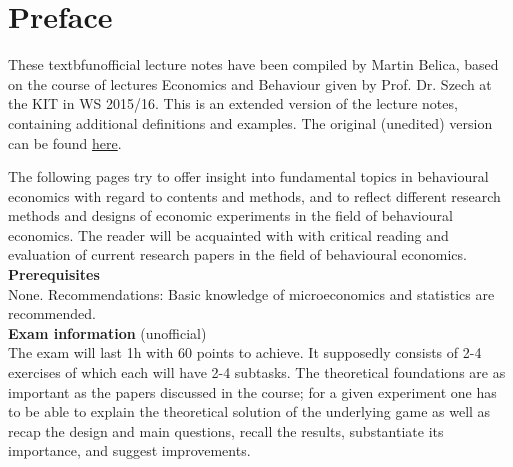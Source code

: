 

\chapter*{Preface}

These textbf{unofficial} lecture notes have been compiled by Martin Belica, based on the course of lectures Economics and Behaviour given by Prof. Dr. Szech at the KIT in WS 2015/16. This is an extended version of the lecture notes, containing additional definitions and examples. The original (unedited) version can be found \href{http://goo.gl/EOC2Kh}{here}.

The following pages try to offer insight into fundamental topics in behavioural economics with regard to contents and methods, and to reflect different research methods and designs of economic experiments in the field of behavioural economics. The reader will be acquainted with with critical reading and evaluation of current research papers in the field of behavioural economics. \\

\textbf{Prerequisites} \\
None. Recommendations: Basic knowledge of microeconomics and statistics are recommended. \\

\textbf{Exam information} (unofficial)  \\
The exam will last 1h with 60 points to achieve. It supposedly consists of 2-4 exercises of which each will have 2-4 subtasks. The theoretical foundations are as important as the papers discussed in the course; for a given experiment one has to be able to explain the theoretical solution of the underlying game as well as recap the design and main questions, recall the results, substantiate its importance, and suggest improvements.